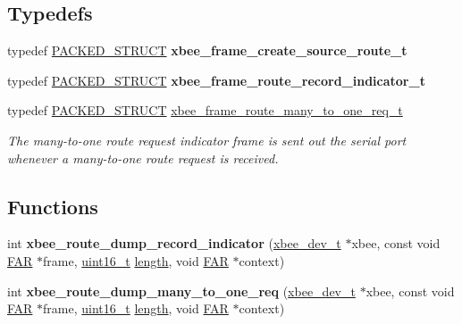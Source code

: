 \subsection*{Typedefs}
\begin{DoxyCompactItemize}
\item 
typedef \hyperlink{group___s_x_a_ga4233297bd31be5c273d4fb0758cc54d7}{P\+A\+C\+K\+E\+D\+\_\+\+S\+T\+R\+U\+CT} {\bfseries xbee\+\_\+frame\+\_\+create\+\_\+source\+\_\+route\+\_\+t}
\item 
typedef \hyperlink{group___s_x_a_ga4233297bd31be5c273d4fb0758cc54d7}{P\+A\+C\+K\+E\+D\+\_\+\+S\+T\+R\+U\+CT} {\bfseries xbee\+\_\+frame\+\_\+route\+\_\+record\+\_\+indicator\+\_\+t}
\item 
typedef \hyperlink{group___s_x_a_ga4233297bd31be5c273d4fb0758cc54d7}{P\+A\+C\+K\+E\+D\+\_\+\+S\+T\+R\+U\+CT} \hyperlink{group__xbee__route_gafc3f728061ea39f21f16bc8ac5d443bd}{xbee\+\_\+frame\+\_\+route\+\_\+many\+\_\+to\+\_\+one\+\_\+req\+\_\+t}
\begin{DoxyCompactList}\small\item\em The many-\/to-\/one route request indicator frame is sent out the serial port whenever a many-\/to-\/one route request is received. \end{DoxyCompactList}\end{DoxyCompactItemize}
\subsection*{Functions}
\begin{DoxyCompactItemize}
\item 
\mbox{\label{group__xbee__route_ga8559adb8f9d26e32597bd6b5d23d4935}} 
int {\bfseries xbee\+\_\+route\+\_\+dump\+\_\+record\+\_\+indicator} (\hyperlink{structxbee__dev__t}{xbee\+\_\+dev\+\_\+t} $\ast$xbee, const void \hyperlink{group__hal_gaef060b3456fdcc093a7210a762d5f2ed}{F\+AR} $\ast$frame, \hyperlink{group__hal__dos_ga5a8b2dc9e45a9ee81a94ef304fb62505}{uint16\+\_\+t} \hyperlink{group__zdo_gab2b3adeb2a67e656ff030b56727fd0ac}{length}, void \hyperlink{group__hal_gaef060b3456fdcc093a7210a762d5f2ed}{F\+AR} $\ast$context)
\item 
\mbox{\label{group__xbee__route_ga73e95bc53a68ff57892795a9b65a2e20}} 
int {\bfseries xbee\+\_\+route\+\_\+dump\+\_\+many\+\_\+to\+\_\+one\+\_\+req} (\hyperlink{structxbee__dev__t}{xbee\+\_\+dev\+\_\+t} $\ast$xbee, const void \hyperlink{group__hal_gaef060b3456fdcc093a7210a762d5f2ed}{F\+AR} $\ast$frame, \hyperlink{group__hal__dos_ga5a8b2dc9e45a9ee81a94ef304fb62505}{uint16\+\_\+t} \hyperlink{group__zdo_gab2b3adeb2a67e656ff030b56727fd0ac}{length}, void \hyperlink{group__hal_gaef060b3456fdcc093a7210a762d5f2ed}{F\+AR} $\ast$context)
\end{DoxyCompactItemize}
